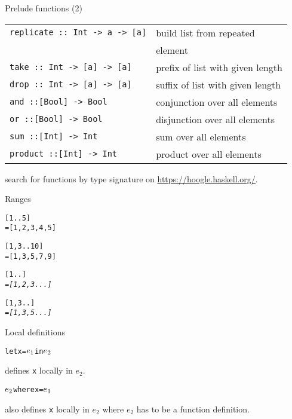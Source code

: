 \documentclass{beamer}
\def\code#1{\texttt{\frenchspacing#1}}
\begin{document}
\begin{frame}{Prelude functions (2)}

\begin{tabularx}{\textwidth}{ll}
    \code{replicate :: Int -> a -> [a]} & build list from repeated \\
    & element \\
    \code{take :: Int -> [a] -> [a]} & prefix of list with given length \\
    \code{drop :: Int -> [a] -> [a]} & suffix of list with given length \\
    \code{and ::[Bool] -> Bool} & conjunction over all elements \\
    \code{or ::[Bool] -> Bool} & disjunction over all elements \\
    \code{sum ::[Int] -> Int} & sum over all elements \\
    \code{product ::[Int] -> Int} & product over all elements \\
\end{tabularx}

\pause

\vspace{1cm}
search for functions by type signature on \url{https://hoogle.haskell.org/}.

\end{frame}

\begin{frame}[fragile]{Ranges}

\begin{alltt}
[1..5]\pause
= [1,2,3,4,5]

[1,3..10]\pause
= [1,3,5,7,9]

[1..]\pause
= \textit{[1,2,3...]}

[1,3..]\pause
= \textit{[1,3,5...]}
\end{alltt}

\end{frame}

\begin{frame}[fragile]{Local definitions}

\begin{alltt}
let x = \(e\sb1\) in \(e\sb2\)
\end{alltt}
defines \code{x} locally in $e_2$.

\pause

\vspace{1cm}
\begin{alltt}
\(e\sb2\) where x = \(e\sb1\)
\end{alltt}
also defines \code{x} locally in $e_2$ where $e_2$ has to be a function definition.

\end{frame}
\end{document}
